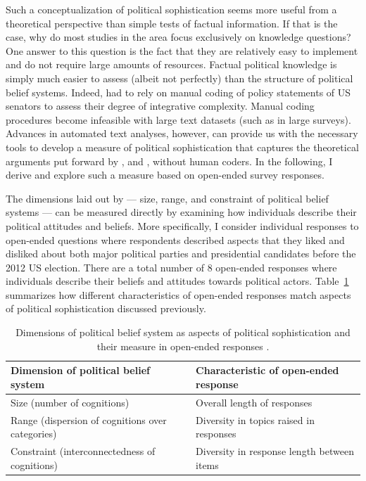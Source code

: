 \documentclass[12pt]{article}
\begin{document}
Such a conceptualization of political sophistication seems more useful from a theoretical perspective than simple tests of factual information. If that is the case, why do most studies in the area focus exclusively on knowledge questions? One answer to this question is the fact that they are relatively easy to implement and do not require large amounts of resources. Factual political knowledge is simply much easier to assess (albeit not perfectly) than the structure of political belief systems. Indeed, \citet{tetlock1983cognitive} had to rely on manual coding of policy statements of US senators to assess their degree of integrative complexity. Manual coding procedures become infeasible with large text datasets (such as in large surveys). Advances in automated text analyses, however, can provide us with the necessary tools to develop a measure of political sophistication that captures the theoretical arguments put forward by \citet{converse1964nature}, \citet{tetlock1983cognitive} and \citet{luskin1987measuring}, without human coders. In the following, I derive and explore such a measure based on open-ended survey responses.

The dimensions laid out by \citet{luskin1987measuring} --- size, range, and constraint of political belief systems --- can be measured directly by examining how individuals describe their political attitudes and beliefs. More specifically, I consider individual responses to open-ended questions where respondents described aspects that they liked and disliked about both major political parties and presidential candidates before the 2012 US election. There are a total number of 8 open-ended responses where individuals describe their beliefs and attitudes towards political actors. Table~\ref{tab:measure} summarizes how different characteristics of open-ended responses match aspects of political sophistication discussed previously.

\begin{table}[h]
\begin{tabularx}{\textwidth}{lX}
\hline 
Dimension of political belief system & Characteristic of open-ended response \\
\hline
Size (number of cognitions) & Overall length of responses \\
Range (dispersion of cognitions over categories) & Diversity in topics raised in responses \\
Constraint (interconnectedness of cognitions) & Diversity in response length between items \\
\hline
\end{tabularx}
\caption{Dimensions of political belief system as aspects of political sophistication and their measure in open-ended responses \citep[c.f.][]{luskin1987measuring}.}\label{tab:measure}
\end{table}
\end{document}
